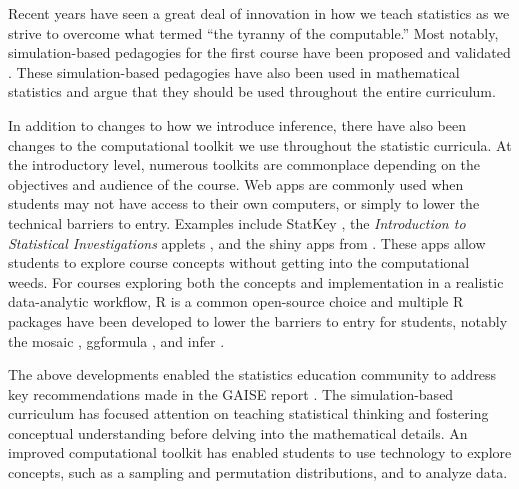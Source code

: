 \documentclass[12pt]{article}
\begin{document}
Recent years have seen a great deal of innovation in how we teach
statistics as we strive to overcome what \citet{Cobb-2007uo} termed
``the tyranny of the computable.'' Most notably, simulation-based
pedagogies for the first course have been proposed and validated
\citep{Cobb-2007uo, Tintle-2011vo, Tintle-2012td, Maurer-2014te, Tintle2014-vt, Hildreth2018}.
These simulation-based pedagogies have also been used in mathematical
statistics \citep{chihara2011, Cobb2011-vz} and \citet{Tintle2015-yv}
argue that they should be used throughout the entire curriculum.

In addition to changes to how we introduce inference, there have also
been changes to the computational toolkit we use throughout the
statistic curricula. At the introductory level, numerous toolkits are
commonplace depending on the objectives and audience of the course. Web
apps are commonly used when students may not have access to their own
computers, or simply to lower the technical barriers to entry. Examples
include StatKey \citep{Lock2017}, the \emph{Introduction to Statistical
Investigations} applets \citep{tintle2015}, and the shiny apps from
\citet{agresti2017}. These apps allow students to explore course
concepts without getting into the computational weeds. For courses
exploring both the concepts and implementation in a realistic
data-analytic workflow, R \citep{r} is a common open-source choice and
multiple R packages have been developed to lower the barriers to entry
for students, notably the mosaic \citep{Pruim2017-uc}, ggformula
\citep{ggformula}, and infer \citep{infer}.

The above developments enabled the statistics education community to
address key recommendations made in the GAISE report \citep{gaise2016}.
The simulation-based curriculum has focused attention on teaching
statistical thinking and fostering conceptual understanding before
delving into the mathematical details. An improved computational toolkit
has enabled students to use technology to explore concepts, such as a
sampling and permutation distributions, and to analyze data.
\end{document}
